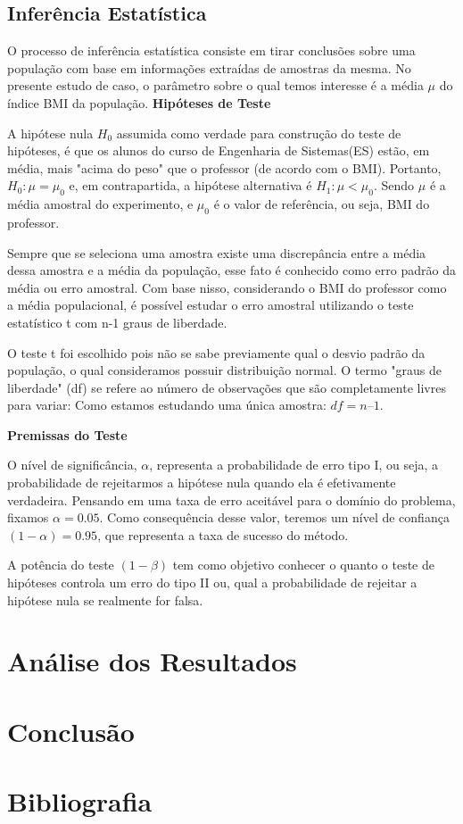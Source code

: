 \documentclass[12pt, a4paper]{article}
\begin{document}
\subsection{Inferência Estatística}
O processo de inferência estatística consiste em tirar conclusões sobre uma população com base em informações extraídas de amostras da mesma. No presente estudo de caso, o parâmetro sobre o qual temos interesse é a média $\mu$ do índice BMI da população.
\newline
\textbf{Hipóteses de Teste}
\par A hipótese nula $H_{0}$ assumida como verdade para construção do teste de hipóteses, é que os alunos do curso de Engenharia de Sistemas(ES) estão, em média, mais "acima do peso" que o professor (de acordo com o BMI). Portanto, $H_{0}: \mu = \mu_{0}$ e, em contrapartida, a hipótese alternativa é $H_{1}: \mu < \mu_{0}$. Sendo $\mu$ é a média amostral do experimento, e $\mu_{0}$ é o valor de referência, ou seja, BMI do professor.
\par Sempre que se seleciona uma amostra existe uma discrepância entre a média dessa amostra e a média da população, esse fato é conhecido como erro padrão da média ou erro amostral. Com base nisso, considerando o BMI do professor como a média populacional, é possível estudar o erro amostral utilizando o teste estatístico t com n-1 graus de liberdade.
\par O teste t foi escolhido pois não se sabe previamente qual o desvio padrão da população, o qual consideramos possuir distribuição normal. O termo "graus de liberdade" (df) se refere ao número de observações que são completamente livres para variar: Como estamos estudando uma única amostra: $df = n – 1$.

\textbf{Premissas do Teste}
\par O nível de significância, $\alpha$, representa a probabilidade de erro tipo I, ou seja, a probabilidade de rejeitarmos a hipótese nula quando ela é efetivamente verdadeira. Pensando em uma taxa de erro aceitável para o domínio do problema, fixamos $\alpha = 0.05$. Como consequência desse valor, teremos um nível de confiança $(1 - \alpha) = 0.95$, que representa a taxa de sucesso do método.
\par A potência do teste $(1 - \beta)$ tem como objetivo conhecer o quanto o teste de hipóteses controla um erro do tipo II ou, qual a probabilidade de rejeitar a hipótese nula se realmente for falsa.

\section{Análise dos Resultados}

\section{Conclusão}

\section{Bibliografia}
		
\end{document}
